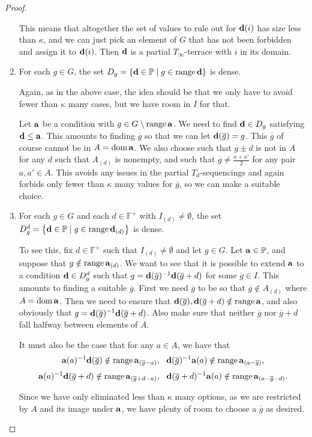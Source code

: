 \documentclass[12pt,a4paper]{article}
\newcommand{\F}{\mathbb{F}}
\DeclareMathOperator{\dom}{dom}
\DeclareMathOperator{\ran}{range}
\newcommand{\st}{\; | \;}
\newcommand{\set}[2]{\left\{#1\st #2 \right\}}
\renewcommand{\P}{\mathbb{P}}
\renewcommand{\a}{\textup{\textbf{a}}}
\newcommand{\g}{\overline{g}}
\renewcommand{\d}{\textup{\textbf{d}}}
\begin{document}
\begin{proof}
\begin{enumerate}
	This means that altogether the set of values to rule out for $\d(i)$ has size less than $\kappa$, and we can just pick an element of \(G\) that has not been forbidden and assign it to \(\d(i)\).
	Then \(\d\) is a partial \(T_\infty\)-terrace with \(i\) in its domain. 
	
	\item For each $g \in G$, the set $D_g=\set{\d \in \P}{g \in \ran \d }$ is dense. 
	
	Again, as in the above case, the idea should be that we only have to avoid fewer than $\kappa$ many cases, but we have room in $I$ for that.
	
	Let $\a$ be a condition with $g \in G \setminus \ran \a$. We need to find $\d \in D_g$ satisfying $\d \leq \a$. This amounts to finding $\g$ so that we can let $\d(\g)=g$.
	This $\g$ of course cannot be in $A=\dom \a$. We also choose such that $\g\pm d$ is not
	in $A$ for any $d$ such that $A_{(d)}$ is nonempty, and such that $\g \neq \frac{a+a'}{2}$ 
	for any pair $a,a'\in A$. This avoids any issues in the partial $T_d$-sequencings and again forbids only fewer than $\kappa$
	many values for $\g$, so we can make a suitable choice. 
		
	\item For each $g \in G$ and each $d \in \F^+$ with $I_{(d)}\neq \emptyset$, the set $D^d_g=\set{\d \in \P}{g \in \ran \d_{(d)}}$ is dense. 
	
	To see this, fix $d \in \F^+$ such that $I_{(d)}\neq \emptyset$ and let $g \in G$. Let $\a \in \P$, and suppose that $g \notin \ran\a_{(d)}$. We want to see that it is possible to extend $\a$ to a condition $\d \in D^d_g$ such that $g=\d(\overline g)^{-1}\d(\overline g+d)$ for some $\overline g \in I$. This amounts to finding a suitable $\overline g$. First we need $\overline g$ to be so that $\overline g \notin A_{(d)}$ where $A = \dom \a$. Then we need to ensure that $\d(\overline g), \d(\overline g+d) \notin \ran \a$, and also obviously that $g=\d(\overline g)^{-1}\d(\overline g+d)$. Also make sure that neither $\g$ nor $\g+d$ fall halfway between elements of $A$.

	It must also be the case that for any $a \in A$, we have that 
		$$\a(a)^{-1}\d(\overline g) \notin \ran \a_{(\overline g-a)}, \ \  \d(\overline{g})^{-1}\a(a) \notin \ran \a_{(a-\overline g)},$$ 
		$$\a(a)^{-1}\d(\overline g+d)  \notin \ran \a_{(\overline g+d-a)}, \ \ \d(\overline g+d)^{-1}\a(a) \notin \ran \a_{(a-\overline g-d)}.$$

		
	Since we have only eliminated less than $\kappa$ many options, as we are restricted by $A$ and its image under $\a$, we have plenty of room to choose a $\overline g$ as desired.


\end{enumerate}
\end{proof}
\end{document}

